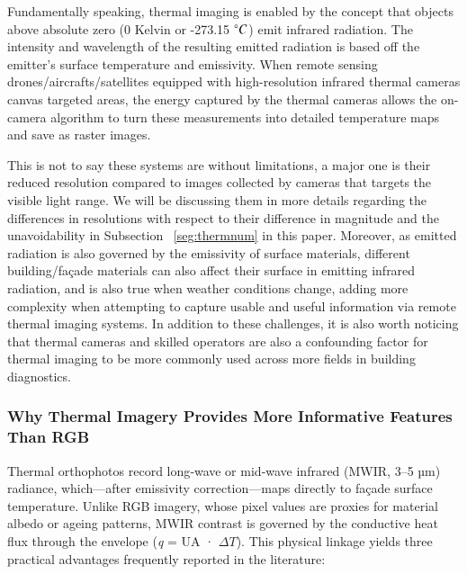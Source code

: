 \documentclass[preprint,12pt]{elsarticle}
\begin{document}
        Fundamentally speaking, thermal imaging is enabled by the concept that objects above absolute zero (0 Kelvin or -273.15 $\degree C$) emit infrared radiation. The intensity and wavelength of the resulting emitted radiation is based off the emitter's surface temperature and emissivity\cite{usamentiaga_infrared_2014}. When remote sensing drones/aircrafts/satellites equipped with high-resolution infrared thermal cameras canvas targeted areas, the energy captured by the thermal cameras allows the on-camera algorithm to turn these measurements into detailed temperature maps and save as raster images\cite{ibarra-castanedo_infrared_2004,kirimtat_review_2018}. 
        
        This is not to say these systems are without limitations, a major one is their reduced resolution compared to images collected by cameras that targets the visible light range. We will be discussing them in more details regarding the differences in resolutions with respect to their difference in magnitude and the unavoidability in Subsection ~\ref{seg:thermnum} in this paper. Moreover, as emitted radiation is also governed by the emissivity of surface materials, different building/façade materials can also affect their surface in emitting infrared radiation\cite{balaras_infrared_2002}, and is also true when weather conditions change\cite{lucchi_applications_2018}, adding more complexity when attempting to capture usable and useful information via remote thermal imaging systems. In addition to these challenges, it is also worth noticing that thermal cameras and skilled operators are also a confounding factor for thermal imaging to be more commonly used across more fields in building diagnostics\cite{kylili_infrared_2014,usamentiaga_infrared_2014}.

  \subsubsection{Why Thermal Imagery Provides More Informative Features Than RGB}\label{sec:why-thermal}

    Thermal orthophotos record long‐wave or mid‐wave infrared (MWIR, 3–5 µm) radiance, which—after emissivity correction—maps directly to façade surface temperature.  
    Unlike RGB imagery, whose pixel values are proxies for material albedo or ageing patterns, MWIR contrast is governed by the conductive heat flux through the envelope (\emph{q} = UA · $\Delta T$).  
    This physical linkage yields three practical advantages frequently reported in the literature:
    
\end{document}
